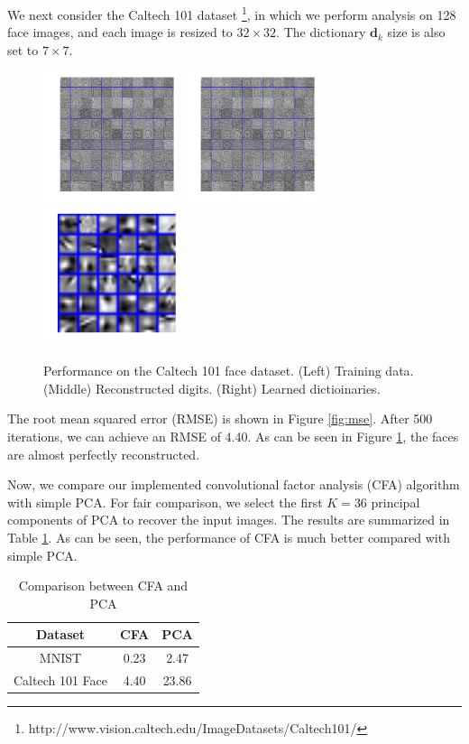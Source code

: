 \documentclass{article} %
\newcommand{\dv}{\boldsymbol{d}}
\begin{document}
We next consider the Caltech 101 dataset \footnote{http://www.vision.caltech.edu/ImageDatasets/Caltech101/}, in which we perform analysis on 128 face images, and each image is resized to $32 \times 32$. The dictionary $\dv_k$ size is also set to $7 \times 7$.

\begin{figure}[h]
   \centering
   \includegraphics[width=4cm]{figures/face_original}  
   \includegraphics[width=4cm]{figures/face_reconstruction} 
   \includegraphics[width=4cm]{figures/face_dictionary}
   \caption{\small{Performance on the Caltech 101 face dataset. (Left) Training data. (Middle) Reconstructed digits. (Right) Learned dictioinaries. }} \label{fig:face}
\end{figure}

The root mean squared error (RMSE) is shown in Figure \ref{fig:mse}. After 500 iterations, we can achieve an RMSE of 4.40. As can be seen in Figure \ref{fig:face}, the faces are almost perfectly reconstructed.

Now, we compare our implemented convolutional factor analysis (CFA) algorithm with simple PCA. For fair comparison, we select the first $K=36$ principal components of PCA to recover the input images. The results are summarized in Table \ref{tab:table}. As can be seen, the performance of CFA is much better compared with simple PCA. 
%
\begin{table}[h]
\centering
\begin{tabular}{|c|c|c|}
\hline
\hline
Dataset & CFA & PCA  \\
\hline
MNIST & 0.23 & 2.47 \\
\hline
Caltech 101 Face & 4.40 & 23.86 \\
\hline
\end{tabular}
\caption{Comparison between CFA and PCA} \label{tab:table}
\end{table}
\end{document}
